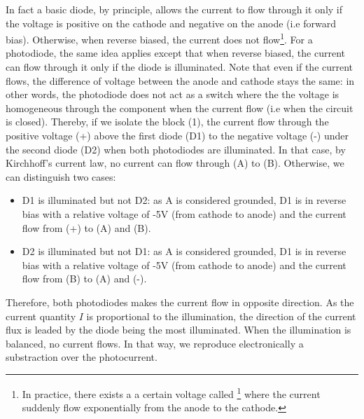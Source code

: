 \documentclass[12pt]{report}
\begin{document}
In fact a basic diode, by principle, allows the current to flow through it only if the voltage is positive on the cathode and negative on the anode (i.e forward bias). Otherwise, when reverse biased, the current does not flow\footnote{In practice, there exists a a certain voltage called \footnote{breakdown voltage} where the current suddenly flow exponentially from the anode to the cathode.}. For a photodiode, the same idea applies except that when reverse biased, the current can flow through it only if the diode is illuminated. Note that even if the current flows, the difference of voltage between the anode and cathode stays the same: in other words, the photodiode does not act as a switch where the the voltage is homogeneous through the component when the current flow (i.e when the circuit is closed). Thereby, if we isolate the block (1), the current flow through the positive voltage (+) above the first diode (D1) to the negative voltage (-) under the second diode (D2) when both photodiodes are illuminated. In that case, by Kirchhoff's current law, no current can flow through (A) to (B). Otherwise, we can distinguish two cases:
\begin{itemize}
 \item D1 is illuminated but not D2: as A is considered grounded, D1 is in reverse bias with a relative voltage of -5V (from cathode to anode) and the current flow from (+) to (A) and (B).
 \item D2 is illuminated but not D1: as A is considered grounded, D1 is in reverse bias with a relative voltage of -5V (from cathode to anode) and the current flow from (B) to (A) and (-).
\end{itemize}
Therefore, both photodiodes makes the current flow in opposite direction. As the current quantity $I$ is proportional to the illumination, the direction of the current flux is leaded by the diode being the most illuminated. When the illumination is balanced, no current flows. In that way, we reproduce electronically a substraction over the photocurrent.
\end{document}
